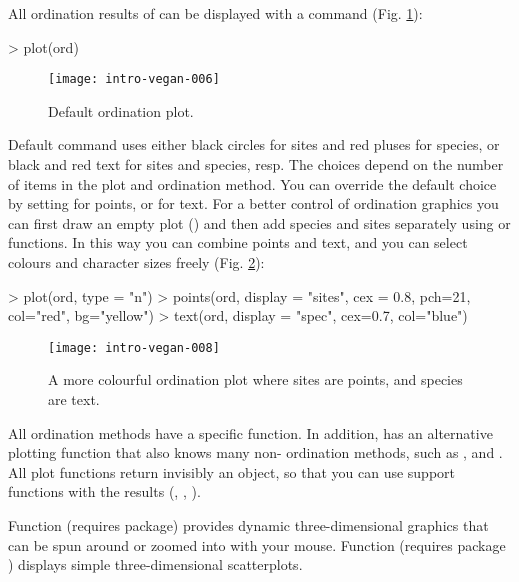 \documentclass[a4paper,10pt]{article}
\begin{document}
All ordination results of  can be displayed with a
 command (Fig. \ref{fig:plot}):
\begin{Schunk}
\begin{Sinput}
> plot(ord)
\end{Sinput}
\end{Schunk}
\begin{figure}
\texttt{[image: intro-vegan-006]}
\caption{Default ordination plot.}
\label{fig:plot}
\end{figure}
Default  command uses either black circles for sites and
red pluses for species, or black and red text for sites and species,
resp.  The choices depend on the number of items in the plot and
ordination method.  You can override the default choice by setting
 for points, or  for text.  For
a better control of ordination graphics you can first draw an empty
plot () and then add species and sites separately
using  or  functions.  In this way you can
combine points and text, and you can select colours and character
sizes freely (Fig. \ref{fig:plot.args}):
\begin{Schunk}
\begin{Sinput}
> plot(ord, type = "n")
> points(ord, display = "sites", cex = 0.8, pch=21, col="red", bg="yellow")
> text(ord, display = "spec", cex=0.7, col="blue")
\end{Sinput}
\end{Schunk}
\begin{figure}
\texttt{[image: intro-vegan-008]}
\caption{A more colourful ordination plot where sites are points, and
  species are text.}
\label{fig:plot.args}
\end{figure}

All  ordination methods have a specific 
function.  In addition,  has an alternative plotting
function  that also knows many non-
ordination methods, such as ,  and
.  All  plot functions return invisibly
an  object, so that you can use 
support functions with the results (, ,
).

Function  (requires  package) provides
dynamic three-dimensional graphics that can be spun around or zoomed
into with your mouse.  Function  (requires package
) displays simple three-dimensional
scatterplots.
\end{document}
